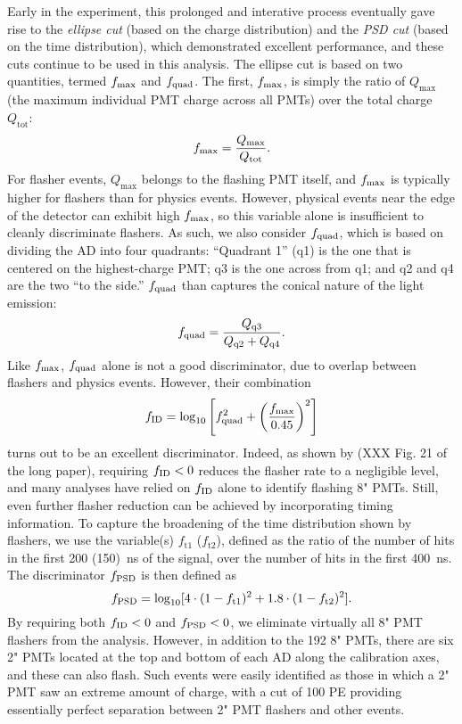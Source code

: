 \documentclass[../thesis.tex]{subfiles}
\begin{document}
Early in the experiment, this prolonged and interative process eventually gave rise to the \emph{ellipse cut} (based on the charge distribution) and the \emph{PSD cut} (based on the time distribution), which demonstrated excellent performance, and these cuts continue to be used in this analysis. The ellipse cut is based on two quantities, termed $f_{\mathrm{max}}$ and $f_{\mathrm{quad}}$. The first, $f_{\mathrm{max}}$, is simply the ratio of $Q_{\mathrm{max}}$ (the maximum individual PMT charge across all PMTs) over the total charge $Q_{\mathrm{tot}}$:
\begin{equation*}
  f_{\mathrm{max}} = \frac{Q_{\mathrm{max}}}{Q_{\mathrm{tot}}}.
\end{equation*}
For flasher events, $Q_{\mathrm{max}}$ belongs to the flashing PMT itself, and $f_{\mathrm{max}}$ is typically higher for flashers than for physics events. However, physical events near the edge of the detector can exhibit high $f_{\mathrm{max}}$, so this variable alone is insufficient to cleanly discriminate flashers. As such, we also consider $f_{\mathrm{quad}}$, which is based on dividing the AD into four quadrants: ``Quadrant 1'' (q1) is the one that is centered on the highest-charge PMT; q3 is the one across from q1; and q2 and q4 are the two ``to the side.'' $f_{\mathrm{quad}}$ than captures the conical nature of the light emission:
\begin{equation*}
  f_{\mathrm{quad}} = \frac{Q_{\mathrm{q3}}}{Q_{\mathrm{q2}} + Q_{\mathrm{q4}}}.
\end{equation*}
Like $f_{\mathrm{max}}$, $f_{\mathrm{quad}}$ alone is not a good discriminator, due to overlap between flashers and physics events. However, their combination
\begin{equation*}
  f_{\mathrm{ID}} = \log_{10} \left[ f_{\mathrm{quad}}^2 + \left( \frac{f_{\mathrm{max}}}{0.45} \right)^2 \right]
\end{equation*}
turns out to be an excellent discriminator. Indeed, as shown by (XXX Fig. 21 of the long paper), requiring $f_{\mathrm{ID}} < 0$ reduces the flasher rate to a negligible level, and many analyses have relied on $f_{\mathrm{ID}}$ alone to identify flashing 8" PMTs. Still, even further flasher reduction can be achieved by incorporating timing information. To capture the broadening of the time distribution shown by flashers, we use the variable(s) $f_{\mathrm{t}1}$ ($f_{\mathrm{t}2}$), defined as the ratio of the number of hits in the first 200 (150)~ns of the signal, over the number of hits in the first 400~ns. The discriminator $f_{\mathrm{PSD}}$ is then defined as
\begin{equation*}
  f_{\mathrm{PSD}} = \log_{10} [4 \cdot (1 - f_{\mathrm{t}1})^2 + 1.8 \cdot (1 - f_{\mathrm{t}2})^2].
\end{equation*}
By requiring both $f_{\mathrm{ID}} < 0$ and $f_{\mathrm{PSD}} < 0$, we eliminate virtually all 8" PMT flashers from the analysis. However, in addition to the 192 8" PMTs, there are six 2" PMTs located at the top and bottom of each AD along the calibration axes, and these can also flash. Such events were easily identified as those in which a 2" PMT saw an extreme amount of charge, with a cut of 100 PE providing essentially perfect separation between 2" PMT flashers and other events.
\end{document}
